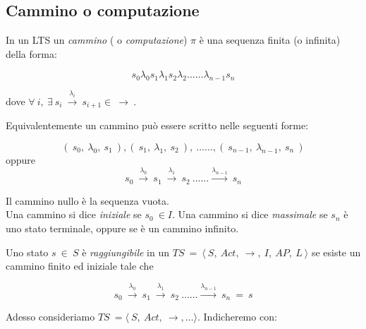 \subsection{Cammino o computazione}
In un LTS un \emph{cammino} ( o \emph{computazione}) $\pi$ è una sequenza finita (o infinita) della forma:

 \begin{equation}
  s_0 \lambda_0 s_1 \lambda_1 s_2 \lambda_2 \dots \dots \lambda_{n-1} s_n 
 \end{equation}
 
 \noindent dove $ \forall\ i,\ \exists\ s_i\ \xrightarrow{ \lambda_i }\ s_{i+1} \in\ \rightarrow\ $.
 
 Equivalentemente un cammino può essere scritto nelle seguenti forme:
 
 \begin{equation}
  (\ s_0,\ \lambda_0,\ s_1\ ), (\ s_1,\ \lambda_1,\ s_2\ ),\ \dots \dots, (\ s_{n-1},\ \lambda_{n-1},\ s_n\ )
 \end{equation}
 oppure
 \begin{equation}
  s_0\ \xrightarrow{ \lambda_0 }\ s_{1}\ \xrightarrow{ \lambda_1 }\ s_{2}\ \dots \dots \xrightarrow{ \lambda_{n-1} }\ s_{n}
 \end{equation}
 
\noindent Il cammino nullo è la sequenza vuota.
 \\
 
 Una cammino si dice \emph{iniziale} se $s_0\ \in I$.  
 Una cammino si dice \emph{massimale} se $s_n$ è uno stato terminale, oppure se è un cammino infinito.
 
 Uno stato $s\ \in\ S$ è \emph{raggiungibile} in un $TS\ =\ \langle\ S,\ Act,\ \rightarrow,\ I,\ AP,\ L\ \rangle$ se esiste un cammino finito ed iniziale tale che
 
  \begin{equation}
  s_0\ \xrightarrow{ \lambda_0 }\ s_{1}\ \xrightarrow{ \lambda_1 }\ s_{2}\ \dots \dots \xrightarrow{ \lambda_{n-1} }\ s_{n}\ =\ s
 \end{equation}
 
 Adesso consideriamo $TS\ = \langle\ S,\ Act,\ \rightarrow, \dots \rangle$. Indicheremo con:
 
